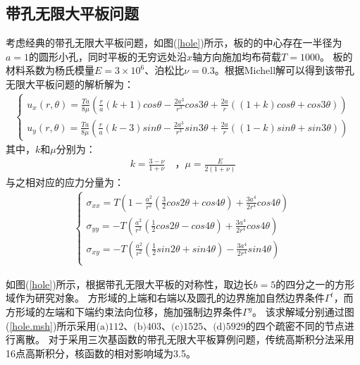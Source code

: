 \subsection{带孔无限大平板问题}
考虑经典的带孔无限大平板问题，如图(\ref{hole})所示，板的的中心存在一半径为$a=1$的圆形小孔，同时平板的无穷远处沿$x$轴方向施加均布荷载$T=1000$。
板的材料系数为杨氏模量$E=3\times10^6$、泊松比$\nu=0.3$。根据Michell解可以得到该带孔无限大平板问题的解析解为：
\begin{equation}
\begin{split}
\begin{cases}
    u_x(r,\theta)=\frac{Ta}{8\mu}(\frac{r}{a}(k+1)cos\theta-\frac{2a^3}{r^3}cos3\theta+\frac{2a}{r}((1+k)cos\theta+cos3\theta))\\
    u_y(r,\theta)=\frac{Ta}{8\mu}(\frac{r}{a}(k-3)sin\theta-\frac{2a^3}{r^3}sin3\theta+\frac{2a}{r}((1-k)sin\theta+sin3\theta))  
\end{cases}
\end{split}
\end{equation}
其中，$k$和$\mu$分别为：
\begin{equation}
\begin{split}
    k=\frac{3-\nu}{1+\nu}\quad \text{，}\mu=\frac{E}{2(1+\nu)}
\end{split}
\end{equation}
与之相对应的应力分量为：
\begin{equation}
\begin{split}
\begin{cases}
    \sigma_{xx}=T(1-\frac{a^2}{r^2}(\frac{3}{2}cos2\theta+cos4\theta)+\frac{3a^4}{2r^4}cos4\theta)\\
    \sigma_{yy}=-T(\frac{a^2}{r^2}(\frac{1}{2}cos2\theta-cos4\theta)+\frac{3a^4}{2r^4}cos4\theta)\\
    \sigma_{xy}=-T(\frac{a^2}{r^2}(\frac{1}{2}sin2\theta+sin4\theta)-\frac{3a^4}{2r^4}sin4\theta)\\
\end{cases}
\end{split}
\end{equation}\par
如图(\ref{hole})所示，根据带孔无限大平板的对称性，取边长$b=5$的四分之一的方形域作为研究对象。
方形域的上端和右端以及圆孔的边界施加自然边界条件$\Gamma^t$，而方形域的左端和下端约束法向位移，施加强制边界条件$\Gamma^g$。
该求解域分别通过图(\ref{hole.msh})所示采用$\text{(a)}112$、$\text{(b)}403$、$\text{(c)}1525$、$\text{(d)}5929$的四个疏密不同的节点进行离散。
对于采用三次基函数的带孔无限大平板算例问题，传统高斯积分法采用16点高斯积分，核函数的相对影响域为3.5。\par
